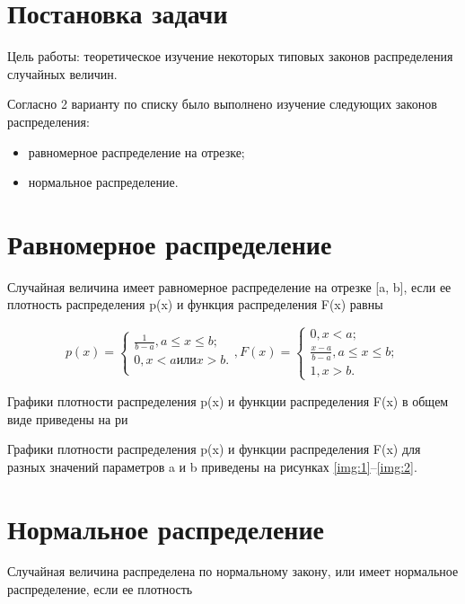 \documentclass[a4paper, 14pt, unknownkeysallowed]{extreport}
\begin{document}

\setcounter{page}{2}

\chapter{Постановка задачи}
Цель работы: теоретическое изучение некоторых типовых законов распределения случайных величин.

Согласно 2 варианту по списку было выполнено изучение следующих законов распределения:
\begin{itemize}
	\item равномерное распределение на отрезке;
	\item нормальное распределение.
\end{itemize}


\chapter{Равномерное распределение}

Случайная величина имеет равномерное распределение на отрезке [a, b], если ее плотность распределения p(x) и функция распределения F(x) равны

\begin{equation}
	p(x) = \begin{cases}
		\frac{1}{b - a}, a\leq x\leq b;\\
		0, x < a или x > b.\\
	\end{cases},   
	F(x) =  \begin{cases}
		0, x < a;\\
		\frac{x-a}{b-a}, a\leq x\leq b;\\
		1, x > b.
	\end{cases}
\end{equation}

Графики плотности распределения p(x) и функции распределения F(x) в общем виде приведены на ри



Графики плотности распределения p(x) и функции распределения F(x) для разных значений параметров a и b приведены на рисунках \ref{img:1}--\ref{img:2}.


\chapter{Нормальное распределение}

Случайная величина распределена по нормальному закону, или имеет нормальное распределение, если ее плотность
\end{document}
